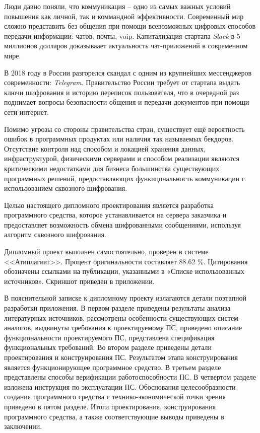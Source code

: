 
Люди давно поняли, что коммуникация -- одно из самых важных условий повышения как личной, так и коммандной эффективности. Современный мир сложно представить без общения при помощи всевозможных цифровых способов передачи информации: чатов, почты, \gls{voip}. Капитализация стартапа \textit{Slack} в 5 миллионов долларов\cite{slack:capitalization} доказываает актуальность чат-приложений в современном мире.

В 2018 году в России разгорелся скандал с одним из крупнейших мессенджеров современности: \textit{Telegram}. Правительство России требует от стартапа выдать ключи шифрования и историю переписок пользователя, что в очередной раз поднимает вопросы безопасности общения и передачи документов при помощи сети интернет\cite{telegram:vs:rkn}.

Помимо угрозы со стороны правительства стран, существует ещё вероятность ошибок в программных продуктах или наличия так называемых бекдоров. Отсутствие контроля над способом и локацией хранения данных, инфраструктурой, физическими серверами и способом реализации являются критическими недостатками для бизнеса большинства существующих программных решений, предоставляющих функицональность коммуникации с использованием сквозного шифрования.

Целью настоящего дипломного проектирования является разработка программного средства, которое устанавливается на сервера заказчика и предоставляет возможность обмена шифрованными сообщениями, используя алгоритм сквозного шифрования.

Дипломный проект выполнен самостоятельно, проверен в системе <<Атиплагиат>>. Процент оригинальности составляет 88.62 \%. Цитирования обозначены ссылками на публикации, указанными в «Списке использованных источников».
Скриншот приведен в приложении.

В пояснительной записке к дипломному проекту излагаются детали поэтапной разработки приложения. В первом разделе приведены результаты анализа литературных источников, рассмотрены особенности существующих систем-аналогов, выдвинуты требования к проектируемому ПС, приведено описание функциональности проектируемого ПС, представлена спецификация функциональных требований. Во втором разделе приведены детали проектирования и конструирования ПС. Результатом этапа конструирования является функционирующее программное средство. В третьем разделе представлены способы верификации работоспособности ПС. В четвертом разделе изложена инструкция по эксплуатации ПС. Обоснования целесообразности создания программного средства с технико-экономической точки зрения приведено в пятом разделе. Итоги проектирования, конструирования программного средства, а также соответствующие выводы приведены в заключении.